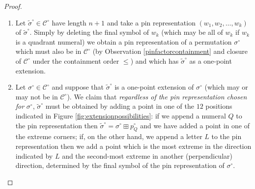 \documentclass[11pt,a4paper]{article}
\theoremstyle{definition}
\begin{document}
\begin{proof}
\begin{enumerate}
\item Let $\widetilde{\sigma}^{\circ} \in \mathcal{C}^{\circ}$ have length $n+1$ and take a pin representation $\left(w_{1}, w_{2}, \dots, w_{k}\right)$ of $\widetilde{\sigma}^{\circ}$. Simply by deleting the final symbol of $w_{k}$ (which may be all of $w_{k}$ if $w_{k}$ is a quadrant numeral) we obtain a pin representation of a permutation $\sigma^{\circ}$ which must also be in $\mathcal{C}^{\circ}$ (by Observation \ref{pinfactorcontainment} and closure of $\mathcal{C}^{\circ}$ under the containment order $\leq$) and which has $\widetilde{\sigma}^{\circ}$ as a one-point extension.
\item Let $\sigma^{\circ} \in \mathcal{C}^{\circ}$ and suppose that $\widetilde{\sigma}^{\circ}$ is a one-point extension of $\sigma^{\circ}$ (which may or may not be in $\mathcal{C}^{\circ}$). We claim that \emph{regardless of the pin representation chosen for} $\sigma^{\circ}$, $\widetilde{\sigma}^{\circ}$ must be obtained by adding a point in one of the $12$ positions indicated in Figure \ref{fig:extensionpossibilities}: if we append a numeral $Q$  to the pin representation then $\widetilde{\sigma}^{\circ} = \sigma^{\circ} \boxplus p^{\circ}_{Q}$ and we have added a point in one of the extreme corners; if, on the other hand, we append a letter $L$ to the pin representation then we add a point which is the most extreme in the direction indicated by $L$ and the second-most extreme in another (perpendicular) direction, determined by the final symbol of the pin representation of $\sigma^{\circ}$. \qedhere
\end{enumerate}
\end{proof}
\end{document}
